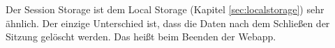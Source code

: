 
Der Session Storage ist dem Local Storage (Kapitel \ref{sec:localstorage}) sehr ähnlich. Der einzige Unterschied ist, dass die Daten nach dem Schließen der Sitzung gelöscht werden. Das heißt beim Beenden der Webapp.


